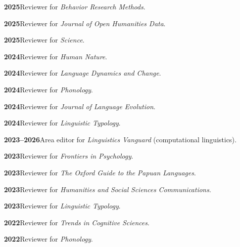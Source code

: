 \documentclass[11pt]{article}
\newcommand{\hangpara}{
 \setlength{\parindent}{0in} %
 \hangindent=0.42in %
}
\begin{document}
\vskip 6pt
\hangpara
{\bf 2025}\hspace{1ex}Reviewer for \textit{Behavior Research Methods}.

\vskip 6pt
\hangpara
{\bf 2025}\hspace{1ex}Reviewer for \textit{Journal of Open Humanities Data}.

\vskip 6pt
\hangpara
{\bf 2025}\hspace{1ex}Reviewer for \textit{Science}.

\vskip 6pt
\hangpara
{\bf 2024}\hspace{1ex}Reviewer for \textit{Human Nature}.

\vskip 6pt
\hangpara
{\bf 2024}\hspace{1ex}Reviewer for \textit{Language Dynamics and Change}.

\vskip 6pt
\hangpara
{\bf 2024}\hspace{1ex}Reviewer for \textit{Phonology}.

\vskip 6pt
\hangpara
{\bf 2024}\hspace{1ex}Reviewer for \textit{Journal of Language Evolution}.

\vskip 6pt
\hangpara
{\bf 2024}\hspace{1ex}Reviewer for \textit{Linguistic Typology}.

\vskip 6pt
\hangpara
{\bf 2023--2026}\hspace{1ex}Area editor for \textit{Linguistics Vanguard} (computational linguistics).

\vskip 6pt
\hangpara
{\bf 2023}\hspace{1ex}Reviewer for \textit{Frontiers in Psychology}.

\vskip 6pt
\hangpara
{\bf 2023}\hspace{1ex}Reviewer for \textit{The Oxford Guide to the Papuan Languages}.

\vskip 6pt
\hangpara
{\bf 2023}\hspace{1ex}Reviewer for \textit{Humanities and Social Sciences Communications}.

\vskip 6pt
\hangpara
{\bf 2023}\hspace{1ex}Reviewer for \textit{Linguistic Typology}.

\vskip 6pt
\hangpara
{\bf 2022}\hspace{1ex}Reviewer for \textit{Trends in Cognitive Sciences}.

\vskip 6pt
\hangpara
{\bf 2022}\hspace{1ex}Reviewer for \textit{Phonology}.
\end{document}

